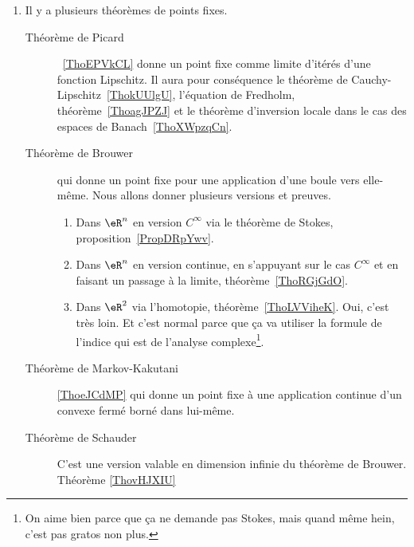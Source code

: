         \label{THEMEooWAYJooUSnmMh}
\begin{enumerate}
	\item
	      Il y a plusieurs théorèmes de points fixes.
	      \begin{description}
		      \item[Théorème de Picard]~\ref{ThoEPVkCL} donne un point fixe comme limite d'itérés d'une fonction Lipschitz. Il aura pour conséquence le théorème de Cauchy-Lipschitz~\ref{ThokUUlgU}, l'équation de Fredholm, théorème~\ref{ThoagJPZJ} et le théorème d'inversion locale dans le cas des espaces de Banach~\ref{ThoXWpzqCn}.
		      \item[Théorème de Brouwer] qui donne un point fixe pour une application d'une boule vers elle-même. Nous allons donner plusieurs versions et preuves.
			      \begin{enumerate}
				      \item
				            Dans \( \eR^n\) en version \( C^{\infty}\) via le théorème de Stokes, proposition~\ref{PropDRpYwv}.
				      \item
				            Dans \( \eR^n\) en version continue, en s'appuyant sur le cas \( C^{\infty}\) et en faisant un passage à la limite, théorème~\ref{ThoRGjGdO}.
				      \item
				            Dans \( \eR^2\) via l'homotopie, théorème~\ref{ThoLVViheK}. Oui, c'est très loin. Et c'est normal parce que ça va utiliser la formule de l'indice qui est de l'analyse complexe\footnote{On aime bien parce que ça ne demande pas Stokes, mais quand même hein, c'est pas gratos non plus.}.
			      \end{enumerate}
			      \item[Théorème de Markov-Kakutani]\ref{ThoeJCdMP} qui donne un point fixe à une application continue d'un convexe fermé borné dans lui-même.
		      \item[Théorème de Schauder] C'est une version valable en dimension infinie du théorème de Brouwer. Théorème \ref{ThovHJXIU}
	      \end{description}


\end{enumerate}
